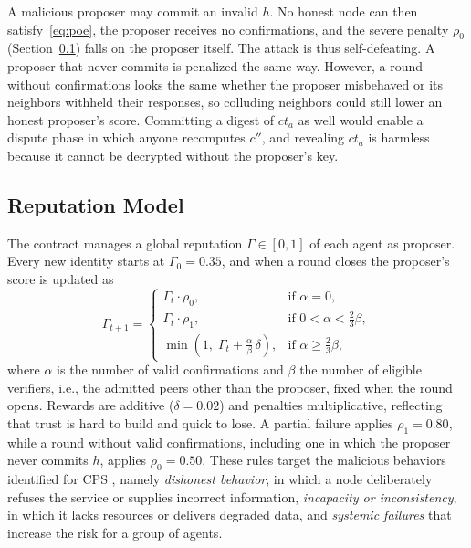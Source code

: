 \documentclass[conference]{IEEEtran}
\begin{document}
A malicious proposer may commit an invalid $h$. No honest node can then satisfy~\eqref{eq:poe}, the proposer receives no confirmations, and the severe penalty $\rho_0$ (Section~\ref{sec:model}) falls on the proposer itself. The attack is thus self-defeating. A proposer that never commits is penalized the same way. However, a round without confirmations looks the same whether the proposer misbehaved or its neighbors withheld their responses, so colluding neighbors could still lower an honest proposer's score. Committing a digest of $\mathit{ct}_a$ as well would enable a dispute phase in which anyone recomputes $c''$, and revealing $\mathit{ct}_a$ is harmless because it cannot be decrypted without the proposer's key.

\subsection{Reputation Model}\label{sec:model}
The contract manages a global reputation $\Gamma \in [0,1]$ of each agent as proposer. Every new identity starts at $\Gamma_0 = 0.35$, and when a round closes the proposer's score is updated as
\begin{equation}\label{eq:global}
  \Gamma_{t+1} = \begin{cases}
    \Gamma_t \cdot \rho_0, & \text{if } \alpha = 0, \\
    \Gamma_t \cdot \rho_1, & \text{if } 0 < \alpha < \tfrac{2}{3}\beta, \\
    \min\!\left(1,\; \Gamma_t + \tfrac{\alpha}{\beta}\,\delta\right), & \text{if } \alpha \geq \tfrac{2}{3}\beta,
  \end{cases}
\end{equation}
where $\alpha$ is the number of valid confirmations and $\beta$ the number of eligible verifiers, i.e., the admitted peers other than the proposer, fixed when the round opens. Rewards are additive ($\delta = 0.02$) and penalties multiplicative, reflecting that trust is hard to build and quick to lose. A partial failure applies $\rho_1 = 0.80$, while a round without valid confirmations, including one in which the proposer never commits $h$, applies $\rho_0 = 0.50$. These rules target the malicious behaviors identified for CPS \cite{chang2013trust}, namely \textit{dishonest behavior}, in which a node deliberately refuses the service or supplies incorrect information, \textit{incapacity or inconsistency}, in which it lacks resources or delivers degraded data, and \textit{systemic failures} that increase the risk for a group of agents.
\end{document}
